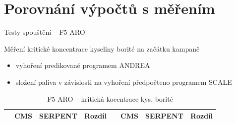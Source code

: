 \documentclass{beamer}
\begin{document}

\section{Porovnání výpočtů s měřením}


\begin{frame}{Testy spouštění -- F5 ARO}
	
\begin{block}{}\small
	Měření kritické koncentrace kyseliny borité na začátku kampaně
\end{block}

\begin{itemize}\footnotesize
	\item vyhoření predikované programem ANDREA
	\item složení paliva v závislosti na vyhoření předpočteno programem SCALE 
\end{itemize}

\begin{table}[h]\scriptsize
	\begin{center}
		\begin{tabular}{cccc|cccc}
			\toprule
			& CMS     & SERPENT & Rozdíl & & CMS & SERPENT & Rozdíl \\
			\midrule
			
			\bottomrule
		\end{tabular}
		\caption{\footnotesize F5 ARO -- kritická kocentrace kys. borité}
	\end{center}
\end{table}
\end{frame}
\end{document}
